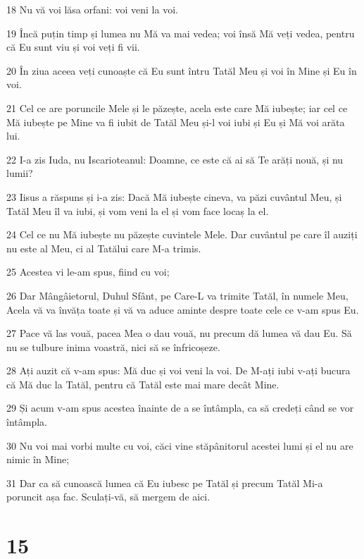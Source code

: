 \par 18 Nu vă voi lăsa orfani: voi veni la voi.
\par 19 Încă puțin timp și lumea nu Mă va mai vedea; voi însă Mă veți vedea, pentru că Eu sunt viu și voi veți fi vii.
\par 20 În ziua aceea veți cunoaște că Eu sunt întru Tatăl Meu și voi în Mine și Eu în voi.
\par 21 Cel ce are poruncile Mele și le păzește, acela este care Mă iubește; iar cel ce Mă iubește pe Mine va fi iubit de Tatăl Meu și-l voi iubi și Eu și Mă voi arăta lui.
\par 22 I-a zis Iuda, nu Iscarioteanul: Doamne, ce este că ai să Te arăți nouă, și nu lumii?
\par 23 Iisus a răspuns și i-a zis: Dacă Mă iubește cineva, va păzi cuvântul Meu, și Tatăl Meu îl va iubi, și vom veni la el și vom face locaș la el.
\par 24 Cel ce nu Mă iubește nu păzește cuvintele Mele. Dar cuvântul pe care îl auziți nu este al Meu, ci al Tatălui care M-a trimis.
\par 25 Acestea vi le-am spus, fiind cu voi;
\par 26 Dar Mângâietorul, Duhul Sfânt, pe Care-L va trimite Tatăl, în numele Meu, Acela vă va învăța toate și vă va aduce aminte despre toate cele ce v-am spus Eu.
\par 27 Pace vă las vouă, pacea Mea o dau vouă, nu precum dă lumea vă dau Eu. Să nu se tulbure inima voastră, nici să se înfricoșeze.
\par 28 Ați auzit că v-am spus: Mă duc și voi veni la voi. De M-ați iubi v-ați bucura că Mă duc la Tatăl, pentru că Tatăl este mai mare decât Mine.
\par 29 Și acum v-am spus acestea înainte de a se întâmpla, ca să credeți când se vor întâmpla.
\par 30 Nu voi mai vorbi multe cu voi, căci vine stăpânitorul acestei lumi și el nu are nimic în Mine;
\par 31 Dar ca să cunoască lumea că Eu iubesc pe Tatăl și precum Tatăl Mi-a poruncit așa fac. Sculați-vă, să mergem de aici.

\chapter{15}

